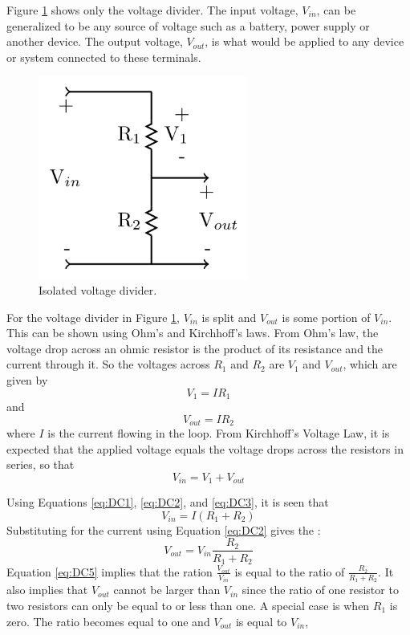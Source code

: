 \noindent Figure \ref{fig:DC5} shows only the voltage divider. The input voltage, $V_{in}$, can be generalized to be any source of voltage such as a battery, power supply or another device. The output voltage, $V_{out}$, is what would be applied to any device or system connected to these terminals.

\begin{figure}[H]
    \centering
    \includegraphics[scale = 0.8]{Images/DC5.PNG}
    \caption{Isolated voltage divider.}
    \label{fig:DC5}
\end{figure}


For the voltage divider in Figure \ref{fig:DC5}, $V_{in}$ is split and $V_{out}$ is some portion of $V_{in}$. This can be shown using Ohm's and Kirchhoff's laws. From Ohm's law, the voltage drop across an ohmic resistor is the product of its resistance and the current through it. So the voltages across $R_1$ and $R_2$ are $V_1$ and $V_{out}$, which are given by \begin{equation}\label{eq:DC1}
    V_1 = IR_1
\end{equation}
and \begin{equation}\label{eq:DC2}
    V_{out} = IR_2
\end{equation}
where $I$ is the current flowing in the loop. From Kirchhoff's Voltage Law, it is expected that the applied voltage equals the voltage drops across the resistors in series, so that \begin{equation}\label{eq:DC3}
    V_{in} = V_1 + V_{out}
\end{equation}

Using Equations \ref{eq:DC1}, \ref{eq:DC2}, and \ref{eq:DC3}, it is seen that \begin{equation}\label{eq:DC4}
    V_{in} = I(R_1+R_2)
\end{equation}
Substituting for the current using Equation \ref{eq:DC2} gives the : \begin{equation}\label{eq:DC5}
    V_{out} = V_{in}\frac{R_2}{R_1+R_2}
\end{equation}
Equation \ref{eq:DC5} implies that the ration $\frac{V_{out}}{V_{in}}$ is equal to the ratio of $\frac{R_2}{R_1+R_2}$. It also implies that $V_{out}$ cannot be larger than $V_{in}$ since the ratio of one resistor to two resistors can only be equal to or less than one. A special case is when $R_1$ is zero. The ratio becomes equal to one and $V_{out}$ is equal to $V_{in}$,

